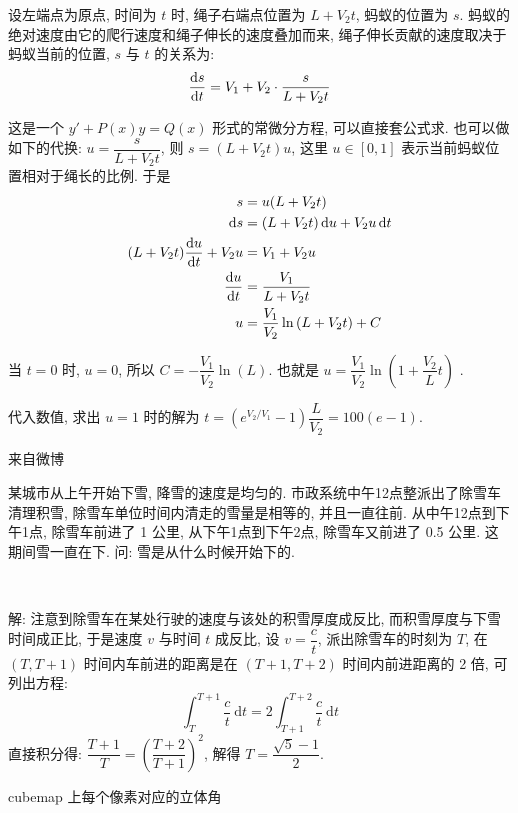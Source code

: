 设左端点为原点, 时间为 $ t $ 时, 绳子右端点位置为 $ L + V_2 t $, 蚂蚁的位置为 $ s $. 蚂蚁的绝对速度由它的爬行速度和绳子伸长的速度叠加而来, 绳子伸长贡献的速度取决于蚂蚁当前的位置, $ s $ 与 $ t $ 的关系为:
\[
\dv{s}{t} = V_1 + V_2\cdot\frac{s}{L+V_2 t}
\]

这是一个 $ y' + P(x)y = Q(x) $ 形式的常微分方程, 可以直接套公式求. 也可以做如下的代换: $ u = \dfrac{s}{L+V_2t} $, 则 $ s = (L+V_2t)u $, 这里 $ u\in[0,1] $ 表示当前蚂蚁位置相对于绳长的比例. 于是
\begin{align*}
s &= u(L+V_2t) \\
\dd{s} &= (L+V_2t)\dd{u} + V_2u\dd{t} \\
(L+V_2t)\dv{u}{t}+V_2u &=V_1+V_2u \\
\dv{u}{t} &=\frac{V_1}{L+V_2t} \\
u &= \frac{V_1}{V_2}\ln{(L+V_2t)} + C
\end{align*}

当 $ t = 0 $ 时, $ u = 0 $, 所以 $ C = -\dfrac{V_1}{V_2}\ln(L) $. 也就是 $ u = \dfrac{V_1}{V_2}\ln{(1+\dfrac{V_2}{L}t)}$ .

代入数值, 求出 $ u = 1 $ 时的解为 $ t = \left(e^{{V_2}/{V_1}}-1\right)\dfrac{L}{V_2} = 100(e-1)$.


\newpage
\noindent 来自微博

某城市从上午开始下雪, 降雪的速度是均匀的. 市政系统中午12点整派出了除雪车清理积雪, 除雪车单位时间内清走的雪量是相等的, 并且一直往前. 从中午12点到下午1点, 除雪车前进了 1 公里, 从下午1点到下午2点, 除雪车又前进了 0.5 公里. 这期间雪一直在下. 问: 雪是从什么时候开始下的.

~

解: 注意到除雪车在某处行驶的速度与该处的积雪厚度成反比, 而积雪厚度与下雪时间成正比, 于是速度 $v$ 与时间 $t$ 成反比, 设 $v = \dfrac{c}{t}$, 派出除雪车的时刻为 $T$, 在 $(T, T+1)$ 时间内车前进的距离是在 $(T+1, T+2)$ 时间内前进距离的 2 倍, 可列出方程:
\[
\int_{T}^{T+1}{\frac{c}{t}}\ \mathrm{d}t = 2\int_{T+1}^{T+2}{\frac{c}{t}}\ \mathrm{d}t
\]
直接积分得: $\dfrac{T+1}{T} = \left(\dfrac{T+2}{T+1}\right)^2$, 解得 $T = \dfrac{\sqrt{5}-1}{2}$.

\newpage
\noindent cubemap 上每个像素对应的立体角


